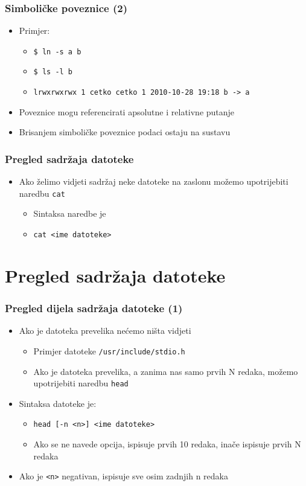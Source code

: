 \documentclass{beamer}
\newcommand{\shell}[1]{\texttt{\small #1}}
\begin{document}
\begin{frame}[t]
\frametitle{Simboličke poveznice (2)}
\begin{itemize}
  \item Primjer:
  \begin{itemize}
    \item[] \shell{\$ ln -s a b}
    \item[] \shell{\$ ls -l b}
    \item[] \shell{\footnotesize lrwxrwxrwx 1 cetko cetko 1 2010-10-28 19:18 b -> a}
  \end{itemize}
  \item Poveznice mogu referencirati apsolutne i relativne putanje
  \item Brisanjem simboličke poveznice podaci ostaju na sustavu
\end{itemize}
\end{frame}


\begin{frame}[t]
\frametitle{Pregled sadržaja datoteke}
\begin{itemize}
  \item Ako želimo vidjeti sadržaj neke datoteke na zaslonu možemo
        upotrijebiti naredbu \shell{cat}
  \begin{itemize}
    \item Sintaksa naredbe je
    \item[] \shell{cat \textless ime datoteke\textgreater}
  \end{itemize}
\end{itemize}
\end{frame}

\section{Pregled sadržaja datoteke}
\begin{frame}[t]
\frametitle{Pregled dijela sadržaja datoteke (1)}
\begin{itemize}
  \item Ako je datoteka prevelika nećemo ništa vidjeti
  \begin{itemize}
    \item Primjer datoteke \shell{/usr/include/stdio.h}
    \item Ako je datoteka prevelika, a zanima nas samo prvih N redaka,
          možemo upotrijebiti naredbu \shell{head}
  \end{itemize}
  \item Sintaksa datoteke je:
  \begin{itemize}
    \item[] \shell{head [-n <n>] <ime datoteke>}
    \item Ako se ne navede opcija, ispisuje prvih 10 redaka, inače ispisuje prvih N redaka
  \end{itemize}
  \item Ako je \shell{<n>} negativan, ispisuje sve osim zadnjih n redaka
\end{itemize}
\end{frame}
\end{document}
